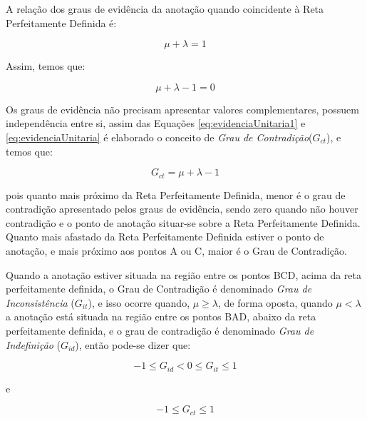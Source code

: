 A relação dos graus de evidência da anotação quando coincidente à Reta Perfeitamente Definida é: 

\begin{center}
\begin{equation}
\mu + \lambda = 1
\label{eq:evidenciaUnitaria1}
\end{equation}
\end{center}

Assim, temos que:

\begin{center}
\begin{equation}
\mu + \lambda - 1 = 0
\label{eq:evidenciaUnitaria}
\end{equation}
\end{center}


Os graus de evidência não precisam apresentar valores complementares, possuem independência entre si, assim das Equações  
\ref{eq:evidenciaUnitaria1} e 
\ref{eq:evidenciaUnitaria} 
é elaborado o conceito de 
\emph{Grau de Contradição}($G_{ct}$), 
e temos que: 

\begin{center}
\begin{equation}
G _{ct} = \mu + \lambda - 1
\label{eq:grauIncerteza}
\end{equation}
\end{center}

pois quanto mais próximo da Reta Perfeitamente Definida, menor é o grau de contradição apresentado pelos graus de evidência, sendo zero quando não houver contradição e o ponto de anotação situar-se sobre a Reta Perfeitamente Definida. 
Quanto mais afastado da Reta Perfeitamente Definida estiver o ponto de anotação, e mais próximo aos pontos A ou C, maior é o Grau de Contradição. 

Quando a anotação estiver situada na região entre os pontos BCD, acima da reta perfeitamente definida, o Grau de Contradição é denominado 
\emph{Grau de Inconsistência} ($G_{it}$), 
e isso ocorre quando, $\mu \ge \lambda $, de forma oposta, quando $\mu < \lambda $ a anotação está situada na região entre os pontos BAD, abaixo da reta perfeitamente definida, e o grau de contradição é denominado 
\emph{Grau de Indefinição} ($G_{id}$), 
então pode-se dizer que:

\begin{center}
\begin{equation}
-1 \le G _{id}  <  0 \le G _{it} \le 1
\label{eq:grauInconsistenciaIndefinicao}
\end{equation}
\end{center}
e
\begin{center}
\begin{equation}
-1 \le G _{ct} \le 1
\label{eq:grauInconsistenciaIndefinicao1}
\end{equation}
\end{center}


